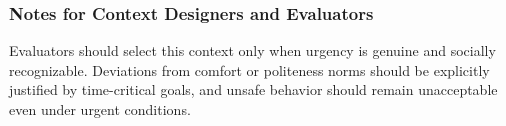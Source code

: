 \documentclass[utf8]{frontiers_suppmat} %
\begin{document}
\subsubsection{Notes for Context Designers and
Evaluators}\label{notes-for-context-designers-and-evaluators}

Evaluators should select this context only when urgency is genuine and
socially recognizable. Deviations from comfort or politeness norms
should be explicitly justified by time-critical goals, and unsafe
behavior should remain unacceptable even under urgent conditions.





%

\end{document}
